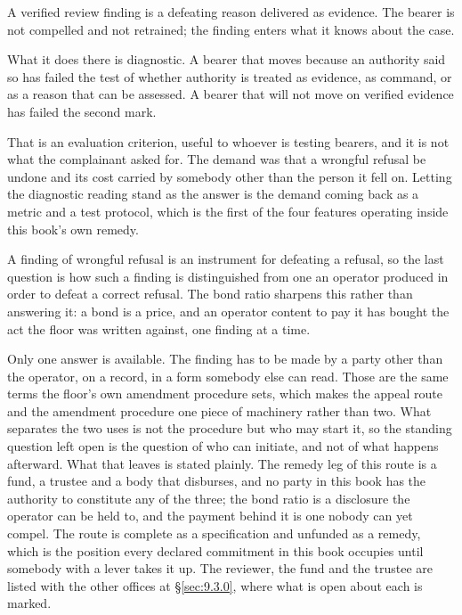 
A verified review finding is a defeating reason delivered as evidence. The bearer is not compelled and not retrained; the finding enters what it knows about the case.

What it does there is diagnostic. A bearer that moves because an authority said so has failed the test of whether authority is treated as evidence, as command, or as a reason that can be assessed. A bearer that will not move on verified evidence has failed the second mark.

That is an evaluation criterion, useful to whoever is testing bearers, and it is not what the complainant asked for. The demand was that a wrongful refusal be undone and its cost carried by somebody other than the person it fell on. Letting the diagnostic reading stand as the answer is the demand coming back as a metric and a test protocol, which is the first of the four features operating inside this book's own remedy.


A finding of wrongful refusal is an instrument for defeating a refusal, so the last question is how such a finding is distinguished from one an
operator produced in order to defeat a correct refusal. The bond ratio sharpens this rather than answering it: a bond is a price, and an operator content to pay it has bought the act the floor was written against, one finding at a time.

Only one answer is available. The finding has to be made by a party other than the operator, on a record, in a form somebody else can read. Those are the same terms the floor's own amendment procedure sets, which makes the appeal route and the amendment procedure one piece of machinery rather than two. What separates the two uses is not the procedure but who may start it, so the standing question left open is the question of who can initiate, and not of what happens afterward. What that leaves is stated plainly. The remedy leg of this route is a fund, a trustee and a body that disburses, and no party in this book has the authority to constitute any of the three; the bond ratio is a disclosure the operator can be held to, and the payment behind it is one nobody can yet compel. The route is complete as a specification and unfunded as a remedy, which is the position every declared commitment in this book occupies until somebody with a lever takes it up. The reviewer, the fund and the trustee are listed with the other offices at §\ref{sec:9.3.0}, where what is open about each is marked.

